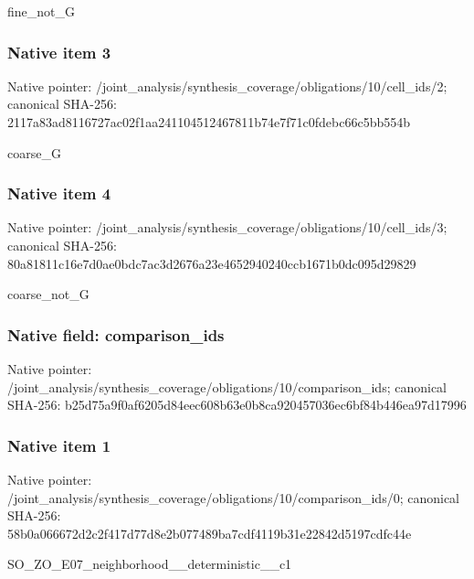\documentclass[10pt,a4paper]{article}
\begin{document}
\begingroup\raggedright\sloppy fine\_\allowbreak{}not\_\allowbreak{}G\par\endgroup

\subsubsection{Native item 3}
Native pointer: /joint\_\allowbreak{}analysis/synthesis\_\allowbreak{}coverage/obligations/10/cell\_\allowbreak{}ids/2; canonical SHA-256: 2117a83ad8116727ac02f1aa241104512467811b74e7f71c0fdebc66c5bb554b

\begingroup\raggedright\sloppy coarse\_\allowbreak{}G\par\endgroup

\subsubsection{Native item 4}
Native pointer: /joint\_\allowbreak{}analysis/synthesis\_\allowbreak{}coverage/obligations/10/cell\_\allowbreak{}ids/3; canonical SHA-256: 80a81811c16e7d0ae0bdc7ac3d2676a23e4652940240ccb1671b0dc095d29829

\begingroup\raggedright\sloppy coarse\_\allowbreak{}not\_\allowbreak{}G\par\endgroup

\subsubsection{Native field: comparison\_\allowbreak{}ids}
Native pointer: /joint\_\allowbreak{}analysis/synthesis\_\allowbreak{}coverage/obligations/10/comparison\_\allowbreak{}ids; canonical SHA-256: b25d75a9f0af6205d84eec608b63e0b8ca920457036ec6bf84b446ea97d17996

\subsubsection{Native item 1}
Native pointer: /joint\_\allowbreak{}analysis/synthesis\_\allowbreak{}coverage/obligations/10/comparison\_\allowbreak{}ids/0; canonical SHA-256: 58b0a066672d2c2f417d77d8e2b077489ba7cdf4119b31e22842d5197cdfc44e

\begingroup\raggedright\sloppy SO\_\allowbreak{}ZO\_\allowbreak{}E07\_\allowbreak{}neighborhood\_\allowbreak{}\_\allowbreak{}deterministic\_\allowbreak{}\_\allowbreak{}c1\par\endgroup
\end{document}
